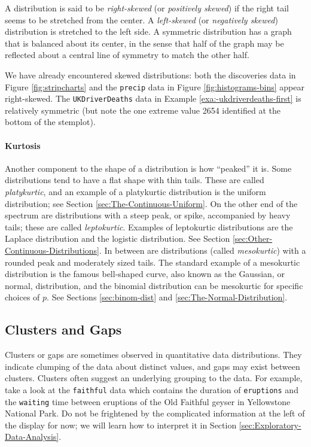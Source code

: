 \documentclass[captions=tableheading]{scrbook}
\begin{document}
A distribution is said to be \emph{right-skewed} (or \emph{positively skewed}) if the right tail seems to be stretched from the center. A \emph{left-skewed} (or \emph{negatively skewed}) distribution is stretched to the left side. A symmetric distribution has a graph that is balanced about its center, in the sense that half of the graph may be reflected about a central line of symmetry to match the other
half.

We have already encountered skewed distributions: both the discoveries data in Figure \ref{fig:stripcharts} and the \texttt{precip} data in Figure \ref{fig:histograms-bins} appear right-skewed. The \texttt{UKDriverDeaths} data in Example \ref{exa:-ukdriverdeaths-first} is relatively symmetric (but note the one extreme value 2654 identified at the bottom of the stemplot).

\paragraph*{Kurtosis}

Another component to the shape of a distribution is how ``peaked'' it is. Some distributions tend to have a flat shape with thin tails. These are called \emph{platykurtic}, and an example of a platykurtic distribution is the uniform distribution; see Section \ref{sec:The-Continuous-Uniform}. On the other end of the spectrum are distributions with a steep peak, or spike, accompanied by heavy tails; these are called \emph{leptokurtic}. Examples of leptokurtic distributions are the Laplace distribution and the logistic distribution. See Section \ref{sec:Other-Continuous-Distributions}. In between are distributions (called \emph{mesokurtic}) with a rounded peak and moderately sized tails. The standard example of a mesokurtic distribution is the famous bell-shaped curve, also known as the Gaussian, or normal, distribution, and the binomial distribution can be mesokurtic for specific choices of \(p\). See Sections \ref{sec:binom-dist} and \ref{sec:The-Normal-Distribution}.
\subsection{Clusters and Gaps}
\label{sec-3-2-4}

\label{sub:clusters-and-gaps}

Clusters or gaps are sometimes observed in quantitative data distributions. They indicate clumping of the data about distinct values, and gaps may exist between clusters. Clusters often suggest an underlying grouping to the data. For example, take a look at the \texttt{faithful} data which contains the duration of \texttt{eruptions} and the \texttt{waiting} time between eruptions of the Old Faithful geyser in Yellowstone National Park. Do not be frightened by the complicated information at the left of the display for now; we will learn how to interpret it in Section \ref{sec:Exploratory-Data-Analysis}.
\end{document}

